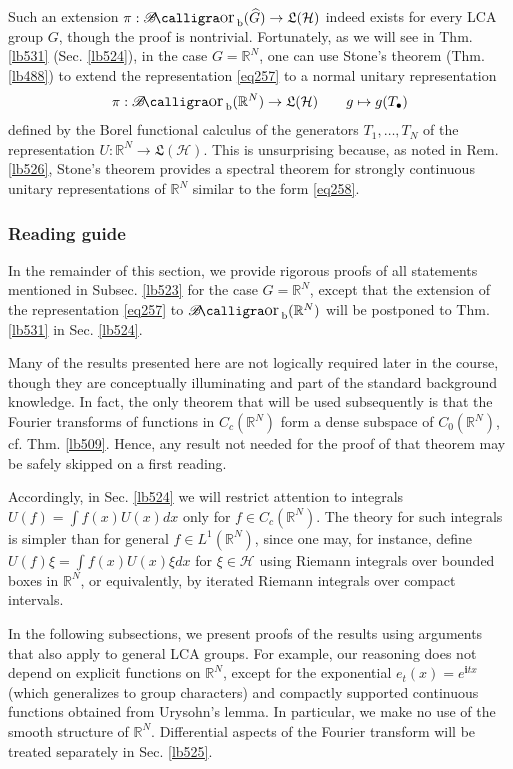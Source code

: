 \documentclass[12pt,b5paper,notitlepage]{article}
\theoremstyle{definition}
\theoremstyle{plain}
\DeclareMathOperator{\Borb}{{\mathscr{B}\text{\kern -2pt {\calligra\large or}}\,}_{\mathrm b}}
\newcommand{\fk}{\mathfrak}
\newcommand{\wht}{\widehat}
\newcommand{\im}{\mathbf{i}}
\newcommand{\blt}{\bullet}
\newcommand{\Rbb}{\mathbb R}
\newcommand{\MH}{\mathcal H}
\numberwithin{equation}{section}
\begin{document}
Such an extension $\pi:\Borb(\wht G)\rightarrow\fk L(\MH)$ indeed exists for every LCA group $G$, though the proof is nontrivial. Fortunately, as we will see in Thm. \ref{lb531} (Sec. \ref{lb524}), in the case $G=\Rbb^N$, one can use Stone's theorem (Thm. \ref{lb488}) to extend the representation \eqref{eq257} to a normal unitary representation
\begin{align*}
\pi:\Borb(\Rbb^N)\rightarrow\fk L(\MH)\qquad g\mapsto g(T_\blt)
\end{align*}
defined by the Borel functional calculus of the generators $T_1,\dots,T_N$ of the representation $U:\Rbb^N\rightarrow\fk L(\MH)$. This is unsurprising because, as noted in Rem. \ref{lb526}, Stone's theorem provides a spectral theorem for strongly continuous unitary representations of $\Rbb^N$ similar to the form \eqref{eq258}.


\subsubsection{Reading guide}\label{lb528}

In the remainder of this section, we provide rigorous proofs of all statements mentioned in Subsec. \ref{lb523} for the case $G=\Rbb^N$, except that the extension of the representation \eqref{eq257} to $\Borb(\Rbb^N)$ will be postponed to Thm. \ref{lb531} in Sec. \ref{lb524}. 

Many of the results presented here are not logically required later in the course, though they are conceptually illuminating and part of the standard background knowledge. In fact, the only theorem that will be used subsequently is that the Fourier transforms of functions in $C_c(\Rbb^N)$ form a dense subspace of $C_0(\Rbb^N)$, cf. Thm. \ref{lb509}. Hence, any result not needed for the proof of that theorem may be safely skipped on a first reading. 

Accordingly, in Sec. \ref{lb524} we will restrict attention to integrals $U(f)=\int f(x)U(x)dx$ only for $f\in C_c(\Rbb^N)$. The theory for such integrals is simpler than for general $f\in L^1(\Rbb^N)$, since one may, for instance, define $U(f)\xi=\int f(x)U(x)\xi dx$ for $\xi\in\MH$ using Riemann integrals over bounded boxes in $\Rbb^N$, or equivalently, by iterated Riemann integrals over compact intervals.


In the following subsections, we present proofs of the results using arguments that also apply to general LCA groups.
For example, our reasoning does not depend on explicit functions on $\Rbb^N$, except for the exponential $e_t(x)=e^{\im tx}$ (which generalizes to group characters) and compactly supported continuous functions obtained from Urysohn's lemma. In particular, we make no use of the smooth structure of $\Rbb^N$. Differential aspects of the Fourier transform will be treated separately in Sec. \ref{lb525}.
\end{document}
